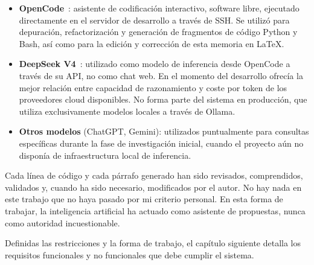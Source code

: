 \begin{itemize}
    \item \textbf{OpenCode}~\cite{opencode}: asistente de codificación interactivo, software libre, ejecutado directamente en el servidor de desarrollo a través de SSH. Se utilizó para depuración, refactorización y generación de fragmentos de código Python y Bash, así como para la edición y corrección de esta memoria en \LaTeX{}.

    \item \textbf{DeepSeek V4}~\cite{deepseek_api}: utilizado como modelo de inferencia desde OpenCode a través de su API, no como chat web. En el momento del desarrollo ofrecía la mejor relación entre capacidad de razonamiento y coste por token de los proveedores cloud disponibles. No forma parte del sistema en producción, que utiliza exclusivamente modelos locales a través de Ollama.

    \item \textbf{Otros modelos} (ChatGPT, Gemini): utilizados puntualmente para consultas específicas durante la fase de investigación inicial, cuando el proyecto aún no disponía de infraestructura local de inferencia.
\end{itemize}

Cada línea de código y cada párrafo generado han sido revisados, comprendidos, validados y, cuando ha sido necesario, modificados por el autor. No hay nada en este trabajo que no haya pasado por mi criterio personal. En esta forma de trabajar, la inteligencia artificial ha actuado como asistente de propuestas, nunca como autoridad incuestionable.

Definidas las restricciones y la forma de trabajo, el capítulo siguiente detalla los requisitos funcionales y no funcionales que debe cumplir el sistema.
